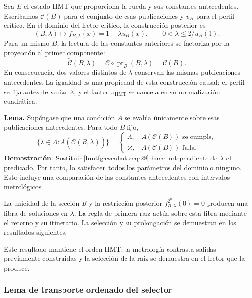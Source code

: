 Sea \(B\) el estado HMT que proporciona la rueda y sus constantes antecedentes. Escribamos \(\mathcal C(B)\) para el conjunto de esas publicaciones y \(u_B\) para el perfil crítico. En el dominio del lector crítico, la construcción posterior es
\begin{equation}
(B,\lambda)\longmapsto f_{B,\lambda}(x)=1-\lambda u_B(x),
\qquad 0<\lambda\le 2/u_B(1).
\label{hmtfg:escalado:eq:27}
\end{equation}
Para un mismo \(B\), la lectura de las constantes anteriores se factoriza por la proyección al primer componente:
\begin{equation}
\widetilde{\mathcal C}(B,\lambda)
=\mathcal C\circ\operatorname{pr}_B(B,\lambda)
=\mathcal C(B).
\label{hmtfg:escalado:eq:28}
\end{equation}
En consecuencia, dos valores distintos de \(\lambda\) conservan las mismas publicaciones antecedentes. La igualdad es una propiedad de esta construcción causal: el perfil se fija antes de variar \(\lambda\), y el factor \(\pi_{\mathrm{HMT}}\) se cancela en su normalización cuadrática.

\textbf{Lema.} Supóngase que una condición \(A\) se evalúa únicamente sobre esas publicaciones antecedentes. Para todo \(B\) fijo,
\begin{equation}
\{\lambda\in\Lambda:A(\widetilde{\mathcal C}(B,\lambda))\}
=
\begin{cases}
\Lambda,&A(\mathcal C(B))\text{ se cumple},\\
\varnothing,&A(\mathcal C(B))\text{ falla}.
\end{cases}
\label{hmtfg:escalado:eq:29}
\end{equation}
\textbf{Demostración.} Sustituir \eqref{hmtfg:escalado:eq:28} hace independiente de \(\lambda\) el predicado. Por tanto, lo satisfacen todos los parámetros del dominio o ninguno. Esto incluye una comparación de las constantes antecedentes con intervalos metrológicos.

La unicidad de la sección \(B\) y la restricción posterior \(f_{B,\lambda}^{2^n}(0)=0\) producen una fibra de soluciones en \(\lambda\). La regla de primera raíz actúa sobre esta fibra mediante el retorno y su itinerario. La selección y su prolongación se demuestran en los resultados siguientes.

Este resultado mantiene el orden HMT: la metrología contrasta salidas previamente construidas y la selección de la raíz se demuestra en el lector que la produce.

\subsubsection{Lema de transporte ordenado del selector}
\label{hmtfg:escalado:13.3}


